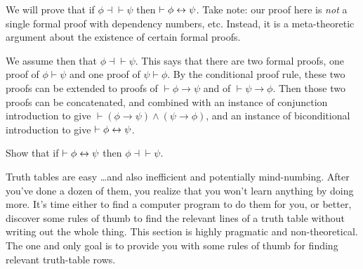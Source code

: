
 


\begin{example} We will prove that if $\phi\dashv\vdash\psi$ then
  $\vdash\phi\leftrightarrow\psi$.  Take note: our proof here is {\it not} a
  single formal proof with dependency numbers, etc.  Instead, it is a
  meta-theoretic argument about the existence of certain formal
  proofs.

  We assume then that $\phi\dashv\vdash\psi$.  This says that there
  are two formal proofs, one proof of $\phi\vdash\psi$ and one proof
  of $\psi\vdash\phi$.  By the conditional proof rule, these two
  proofs can be extended to proofs of $\vdash\phi\to\psi$ and of
  $\vdash\psi\to\phi$.  Then those two proofs can be concatenated, and
  combined with an instance of conjunction introduction to give
  $\vdash(\phi\to\psi)\wedge (\psi\to \phi)$, and an instance of
  biconditional introduction to give $\vdash
  \phi\leftrightarrow\psi$. \end{example}

\begin{exercise} Show that if $\vdash\phi\leftrightarrow\psi$ then
  $\phi\dashv\vdash\psi$. \end{exercise}
 
Truth tables are easy \dots and also inefficient and potentially
mind-numbing.  After you've done a dozen of them, you realize that you
won't learn anything by doing more.  It's time either to find a
computer program to do them for you, or better, discover some rules of
thumb to find the relevant lines of a truth table without writing out
the whole thing.  This section is highly pragmatic and
non-theoretical.  The one and only goal is to provide you with some
rules of thumb for finding relevant truth-table rows.


